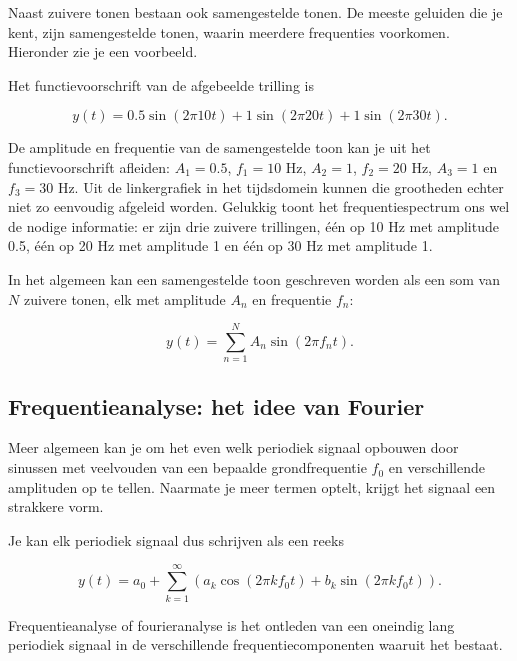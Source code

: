 Naast zuivere tonen bestaan ook samengestelde tonen. De meeste geluiden die je kent, zijn samengestelde tonen, waarin meerdere frequenties voorkomen. Hieronder zie je een voorbeeld.


Het functievoorschrift van de afgebeelde trilling is 

\begin{equation*}
y(t) = 0.5 \sin(2 \pi 10 t) + 1 \sin(2 \pi 20 t) + 1 \sin(2 \pi 30 t).
\end{equation*}

De amplitude en frequentie van de samengestelde toon kan je uit het functievoorschrift afleiden: $A_1 = 0.5$, $f_1 = 10$ Hz, $A_2 = 1$, $f_2 = 20$ Hz, $A_3 = 1$ en $f_3 = 30$ Hz. Uit de linkergrafiek in het tijdsdomein kunnen die grootheden echter niet zo eenvoudig afgeleid worden. Gelukkig toont het frequentiespectrum ons wel de nodige informatie: er zijn drie zuivere trillingen, \'e\'en op 10 Hz met amplitude 0.5, \'e\'en op 20 Hz met amplitude 1 en \'e\'en op 30 Hz met amplitude 1.

In het algemeen kan een samengestelde toon geschreven worden als een som van $N$ zuivere tonen, elk met amplitude $A_n$ en frequentie $f_n$:

\begin{equation*}
y(t) = \sum_{n=1}^{N} A_n \sin(2 \pi f_n t).
\end{equation*}

\subsection{Frequentieanalyse: het idee van Fourier}

Meer algemeen kan je om het even welk periodiek signaal opbouwen door sinussen met veelvouden van een bepaalde grondfrequentie $f_0$ en verschillende amplituden op te tellen. Naarmate je meer termen optelt, krijgt het signaal een strakkere vorm.

Je kan elk periodiek signaal dus schrijven als een reeks

\begin{equation*}
y(t) = a_0 + \sum_{k=1}^{\infty} (a_k \cos(2 \pi k f_0 t) + b_k \sin(2 \pi k f_0 t)).
\end{equation*}

Frequentieanalyse of fourieranalyse is het ontleden van een oneindig lang periodiek signaal in de verschillende frequentiecomponenten waaruit het bestaat. 


